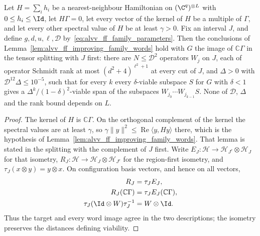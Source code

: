 \begin{lemma}
    \label{lem:alvv_ff_family_region_coordinates}
    \leanok
    Let $H=\sum_ih_i$ be a nearest-neighbour Hamiltonian on $(\C^q)^{\otimes L}$
    with $0\le h_i\le\Id$, let $H\Gamma=0$, let every vector of the kernel of
    $H$ be a multiple of $\Gamma$, and let every other spectral value of $H$ be
    at least $\gamma>0$. Fix an interval $J$, and define $g,d,u,\ell,\mathcal D$
    by~\eqref{eq:alvv_ff_family_parameters}. Then the conclusions of
    Lemma~\ref{lem:alvv_ff_improving_family_words} hold with $G$ the image of
    $\mathbb C\Gamma$ in the tensor splitting with $J$ first: there are
    $N\le\mathcal D^2$ operators $W_j$ on $J$, each of operator Schmidt rank at
    most $(d^2+4)^{\ell^2+1}$ at every cut of $J$, and $\Delta>0$ with
    $\mathcal D^{12}\Delta\le10^{-5}$, such that for every $k$ every
    $\delta$-viable subspace $S$ for $G$ with $\delta<1$ gives a
    $\Delta^k/(1-\delta)^2$-viable span of the subspaces
    $W_{j_0}\cdots W_{j_{k-1}}S$. None of $\mathcal D$, $\Delta$ and the rank
    bound depends on $L$.
\end{lemma}
\begin{proof}\leanok
    The kernel of $H$ is $\mathbb C\Gamma$. On the orthogonal complement of the
    kernel the spectral values are at least $\gamma$, so
    $\gamma\|y\|^2\le\operatorname{Re}\langle y,Hy\rangle$ there, which is the
    hypothesis of Lemma~\ref{lem:alvv_ff_improving_family_words}. That lemma is
    stated in the splitting with the complement of $J$ first. Write
    $E_J:\mathcal H\to\mathcal H_{J^c}\otimes\mathcal H_J$ for that
    isometry, $R_J:\mathcal H\to\mathcal H_J\otimes\mathcal H_{J^c}$ for
    the region-first isometry, and $\tau_J(x\otimes y)=y\otimes x$. On
    configuration basis vectors, and hence on all vectors,
    \begin{align}
        R_J                             & =\tau_J E_J,\nonumber         \\
        R_J(\mathbb C\Gamma)            & =\tau_J E_J(\mathbb C\Gamma),
        \label{eq:alvv_ff_region_coordinate_swap}                       \\
        \tau_J(\Id\otimes W)\tau_J^{-1} & =W\otimes\Id.
        \label{eq:alvv_ff_region_operator_swap}
    \end{align}
    Thus the target and every word image agree in the two descriptions;
    the isometry preserves the distances defining viability.
\end{proof}


